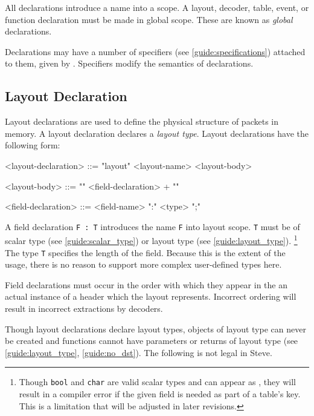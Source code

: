 All declarations introduce a name into a scope. A layout, decoder, table, event, or function declaration must be made in global scope. These are known as \textit{global} declarations.

Declarations may have a number of specifiers (see \ref{guide:specifications}) attached to them, given by . Specifiers modify the semantics of declarations.
 
\subsection{Layout Declaration} \label{guide:layout}

Layout declarations are used to define the physical structure of packets in memory. A layout declaration declares a \textit{layout type}. Layout declarations have the following form:

\begin{minip}
\begin{grammar}
<layout-declaration> ::=
"layout" <layout-name> <layout-body>

<layout-body> ::=
"{"
	<field-declaration> +
"}"

<field-declaration> ::=
<field-name> ":" <type> ";"
\end{grammar}
\end{minip}

A field declaration \texttt{F : T} introduces the name \texttt{F} into layout scope. \texttt{T} must be of scalar type (see \ref{guide:scalar_type}) or layout type (see \ref{guide:layout_type}).
\footnote{Though \texttt{bool} and \texttt{char} are valid scalar types and can appear as , they will result in a compiler error if the given field is needed as part of a table's key. This is a limitation that will be adjusted in later revisions.} The type \texttt{T} specifies the length of the field. Because this is the extent of the usage, there is no reason to support more complex user-defined types here.

Field declarations must occur in the order with which they appear in the an actual instance of a header which the layout represents. Incorrect ordering will result in incorrect extractions by decoders.

Though layout declarations declare layout types, objects of layout type can never be created and functions cannot have parameters or returns of layout type (see \ref{guide:layout_type}, \ref{guide:no_dst}). The following is not legal in Steve. 

